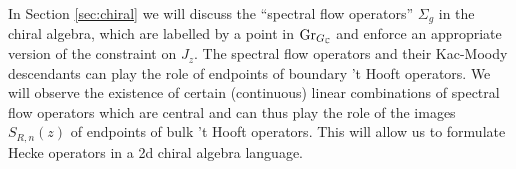 \documentclass[11pt,a4paper]{article}
\begin{document}
In Section \ref{sec:chiral} we will discuss the ``spectral flow operators'' $\Sigma_g$ in the chiral algebra, which are labelled by a point in 
${\mathrm{Gr}}_{G_{\mathbb C}}$ and enforce an appropriate version of the constraint on $J_z$. The spectral flow operators and their Kac-Moody descendants 
can play the role of endpoints of boundary 't Hooft operators. We will observe the existence of certain (continuous) linear combinations of 
spectral flow operators which are central and can thus play the role of the images $S_{R,n}(z)$ of endpoints of bulk 't Hooft operators. 
This will allow us to formulate Hecke operators in a 2d chiral algebra language. 



%
%
%
%
\end{document}
